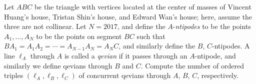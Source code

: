 Let $ABC$ be the triangle with vertices located at the center of masses of Vincent Huang's house, Tristan Shin's house, and Edward Wan's house; here, assume the three are not collinear. Let $N = 2017$, and define the $A$-\emph{ntipodes} to be the points $A_1,\dots, A_N$ to be the points on segment $BC$ such that $BA_1 = A_1A_2 = \cdots = A_{N-1}A_N = A_NC$, and similarly define the $B$, $C$-ntipodes. A line $\ell_A$ through $A$ is called a \emph{qevian} if it passes through an $A$-ntipode, and similarly we define qevians through $B$ and $C$. Compute the number of ordered triples $(\ell_A, \ell_B, \ell_C)$ of concurrent qevians through $A$, $B$, $C$, respectively.
